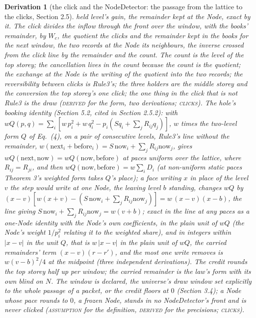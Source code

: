 \documentclass[pdflatex,sn-mathphys-num]{sn-jnl}
\newcommand{\claimmark}[1]{\textup{\textsc{#1}}}
\newcommand{\fence}[1]{\textup{\textsc{#1}}}
\newcommand{\Wc}{W_c}
\theoremstyle{thmstyleone}
\newtheorem{derivation}{Derivation}
\begin{document}
\begin{derivation}[the click and the NodeDetector: the passage from the lattice to the clicks, Section 2.5]
held level's gain, the remainder kept at the Node, exact by it. The click divides the inflow through the front over the window, with the books' remainder, by $\Wc$, the quotient the clicks and the remainder kept in the books for the next window, the two records at the Node its neighbours, the inverse crossed from the click line by the remainder and the count. The count is the level of the top storey; the cancellation lives in the count because the count is the quotient; the exchange at the Node is the writing of the quotient into the two records; the reversibility between clicks is Rule3's; the three holders are the middle storey and the conversion the top storey's one click; the one thing in the click that is not Rule3 is the draw (\claimmark{derived} for the form, two derivations; \fence{clicks}). The hole's booking identity (Section 5.2, cited in Section 2.5.2): with $wQ(p, q) = \sum_i [w\,p_i^2 + w\,q_i^2 - p_i(S q_i + \sum_j R_{ij} q_j)]$, $w$ times the two-level form $Q$ of Eq.~(4), on a pair of consecutive levels, Rule3's line without the remainder, $w(\mathrm{next}_i + \mathrm{before}_i) = S\,\mathrm{now}_i + \sum_j R_{ij}\mathrm{now}_j$, gives $wQ(\mathrm{next}, \mathrm{now}) = wQ(\mathrm{now}, \mathrm{before})$ at paces uniform over the lattice, where $R_{ij} = R_{ji}$, and then $wQ(\mathrm{now}, \mathrm{before}) = w\sum_i D_i$ (at non-uniform static paces Theorem 3's weighted form takes $Q$'s place); a face writing $x$ in place of the level $v$ the step would write at one Node, the leaving level $b$ standing, changes $wQ$ by $(x - v)[w(x + v) - (S\,\mathrm{now}_i + \sum_j R_{ij}\mathrm{now}_j)] = w\,(x - v)(x - b)$, the line giving $S\,\mathrm{now}_i + \sum_j R_{ij}\mathrm{now}_j = w(v + b)$; exact in the line at any paces as a one-Node identity with the Node's own coefficients, in the plain unit of $wQ$ (the Node's weight $1 / p_i^2$ relating it to the weighted share), and in integers within $|x - v|$ in the unit $Q$, that is $w\,|x - v|$ in the plain unit of $wQ$, the carried remainders' term $(x - v)(r - r')$, and the most one write removes is $w(v - b)^2 / 4$ at the midpoint (three independent derivations). The credit rounds the top storey half up per window; the carried remainder is the law's form with its own blind on $N$. The window is declared, the universe's draw window set explicitly to the whole passage of a packet, or the credit floors at $0$ (Section 3.4); a Node whose pace rounds to $0$, a frozen Node, stands in no NodeDetector's front and is never clicked (\claimmark{assumption} for the definition, \claimmark{derived} for the precisions; \fence{clicks}).


\end{derivation}
\end{document}
